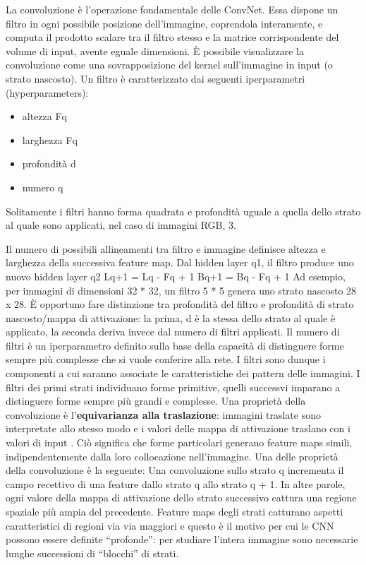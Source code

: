 \documentclass[14pt]{extarticle}
\begin{document}
La convoluzione è l’operazione fondamentale delle ConvNet. Essa dispone un filtro in ogni possibile posizione dell’immagine, coprendola interamente, e computa il prodotto scalare tra il filtro stesso e la matrice corrispondente del volume di input, avente
eguale dimensioni. È possibile visualizzare la convoluzione come una sovrapposizione del kernel sull’immagine in input (o strato nascosto). \cite{aggarwal2018neural} 
Un filtro è caratterizzato dai
seguenti iperparametri (hyperparameters):
\begin{itemize}
\item altezza Fq
\item larghezza Fq
\item profondità d
\item numero q
\end{itemize}
Solitamente i filtri hanno forma quadrata e profondità uguale a quella dello strato al
quale sono applicati, nel caso di immagini RGB, 3.  
Il numero di possibili allineamenti tra filtro e immagine definisce altezza e larghezza della successiva feature
map.
Dal hidden layer q1, il filtro produce uno nuovo hidden layer q2
Lq+1 = Lq - Fq + 1
Bq+1 = Bq - Fq + 1
Ad esempio, per immagini di dimensioni 32 * 32, un filtro 5 * 5 genera uno strato
nascosto 28 x 28.
È opportuno fare distinzione tra profondità del filtro e profondità di strato nascosto/mappa di attivazione: la prima, d è la stessa dello strato al quale è applicato, la
seconda deriva invece dal numero di filtri applicati. Il numero di filtri è un iperparametro definito sulla base della capacità di distinguere forme sempre più complesse che
si vuole conferire alla rete. I filtri sono dunque i componenti a cui saranno associate le
caratteristiche dei pattern delle immagini.
I filtri dei primi strati individuano forme primitive, quelli successvi imparano a distinguere forme sempre più grandi e complesse. Una proprietà della convoluzione è
l’\textbf{equivarianza alla traslazione}: immagini traslate sono interpretate allo stesso modo e
i valori delle mappa di attivazione traslano con i valori di input \cite{torresin2019sviluppo}. Ciò significa che forme particolari generano feature maps simili, indipendentemente dalla loro collocazione
nell’immagine.
Una delle proprietà della convoluzione è la seguente:
Una convoluzione sullo strato q incrementa il campo recettivo di una feature dallo strato q allo strato q + 1. In altre parole, ogni valore della mappa di attivazione dello strato successivo cattura una regione
spaziale più ampia del precedente. Feature maps degli strati catturano aspetti caratteristici di regioni via via maggiori e questo è il motivo per cui le CNN possono essere
definite “profonde”: per studiare l’intera immagine sono necessarie lunghe successioni
di “blocchi” di strati. 
\end{document}
